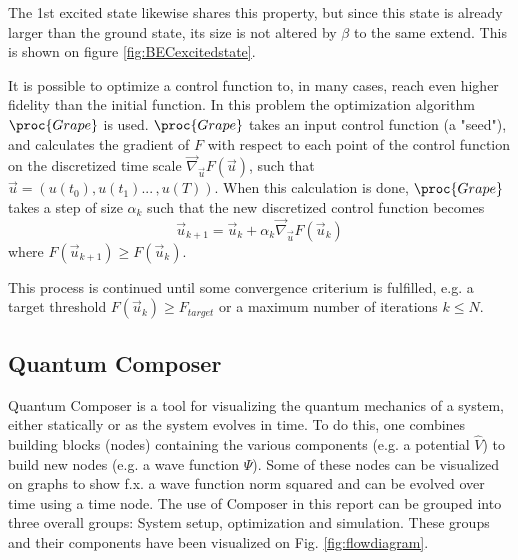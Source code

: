 \documentclass[a4paper, twocolumn]{revtex4-1}
\begin{document}
The 1st excited state likewise shares this property, but since this state is already larger than the ground state, its size is not altered by $\beta$ to the same extend. This is shown on figure \ref{fig:BECexcitedstate}.

It is possible to optimize a control function to, in many cases, reach even higher fidelity than the initial function. In this problem the optimization algorithm $\proc{Grape}$ is used. $\proc{Grape}$ takes an input control function (a "seed"), and calculates the gradient of $F$ with respect to each point of the control function on the discretized time scale $\vec{\nabla}_{\vec{u}}F(\vec{u})$, such that $\vec{u} = (u(t_0), u(t_1) ... \,, u(T))$. When this calculation is done, $\proc{Grape}$ takes a step of size $\alpha_k$ such that the new discretized control function becomes
\begin{equation}
	\vec{u}_{k+1} = \vec{u}_{k} + \alpha_k \vec{\nabla}_{\vec{u}}F(\vec{u}_k)
\end{equation}
where $F(\vec{u}_{k+1}) \geq F(\vec{u}_{k})$.

This process is continued until some convergence criterium is fulfilled, e.g. a target threshold $F(\vec{u}_{k}) \geq F_{target}$ or a maximum number of iterations $k \leq N$.

\subsection{Quantum Composer}
Quantum Composer is a tool for visualizing the quantum mechanics of a system, either statically or as the system evolves in time. To do this, one combines building blocks (nodes) containing the various components (e.g. a potential $\hat{V}$) to build new nodes (e.g. a wave function $\Psi$). Some of these nodes can be visualized on graphs to show f.x. a wave function norm squared and can be evolved over time using a time node. The use of Composer in this report can be grouped into three overall groups: System setup,  optimization and simulation. These groups and their components have been visualized on Fig. \ref{fig:flowdiagram}. 
\end{document}
